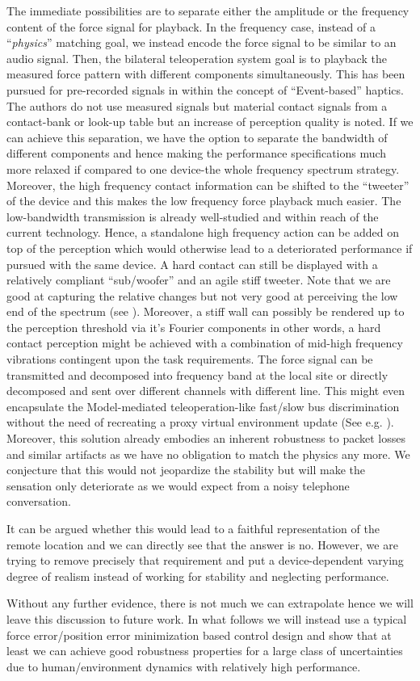 The immediate possibilities are to separate either the amplitude or the frequency content of the force signal for playback. In the frequency
case, instead of a \enquote{\emph{physics}} matching goal, we instead encode the force signal to be similar to an audio signal. Then, the 
bilateral teleoperation system goal is to playback the measured force pattern with different components simultaneously. This has been pursued for 
pre-recorded signals in \cite{kuchenbecker} within the concept of \enquote{Event-based} haptics. The authors do not use measured 
signals but material contact signals from a contact-bank or look-up table but an increase of perception quality is noted. If we can achieve this separation, 
we have the option to separate the bandwidth of different components and hence making the performance specifications much more 
relaxed if compared to one device-the whole frequency spectrum strategy. Moreover, the high frequency contact information can be shifted 
to the \enquote{tweeter} of the device and this makes the low frequency force playback much easier. The low-bandwidth transmission is already 
well-studied and within reach of the current technology. Hence, a standalone high frequency action can be added on top of the perception 
which would otherwise lead to a deteriorated performance if pursued with the same device. A hard contact can still be displayed with a 
relatively compliant \enquote{sub/woofer} and an agile stiff tweeter. Note that we are good at capturing the relative changes but not very good at 
perceiving the low end of the spectrum (see ). Moreover, a stiff wall can possibly be rendered up to the perception 
threshold via it's Fourier components in other words, a hard contact perception might be achieved with a combination of mid-high frequency
vibrations contingent upon the task requirements. The force signal can be transmitted and decomposed into frequency band at the local site
or directly decomposed and sent over different channels with different line. This might even encapsulate the Model-mediated teleoperation-like
fast/slow bus discrimination without the need of recreating a proxy virtual environment update (See e.g. \cite{mitraniemeyer}). Moreover, this 
solution already embodies an inherent robustness to packet losses and similar artifacts as we have no obligation to match the physics any more. 
We conjecture that this would not jeopardize the stability but will make the sensation only deteriorate as we would expect from a noisy telephone 
conversation. 


It can be argued whether this would lead to a faithful representation of the remote location and we can directly see that the answer is no. 
However, we are trying to remove precisely that requirement and put a device-dependent varying degree of realism instead of working for 
stability and neglecting performance. 


Without any further evidence, there is not much we can extrapolate hence we will leave this discussion to future work. In what follows
we will instead use a typical force error/position error minimization based control design and show that at least we can achieve good 
robustness properties for a large class of uncertainties due to human/environment dynamics with relatively high performance. 


